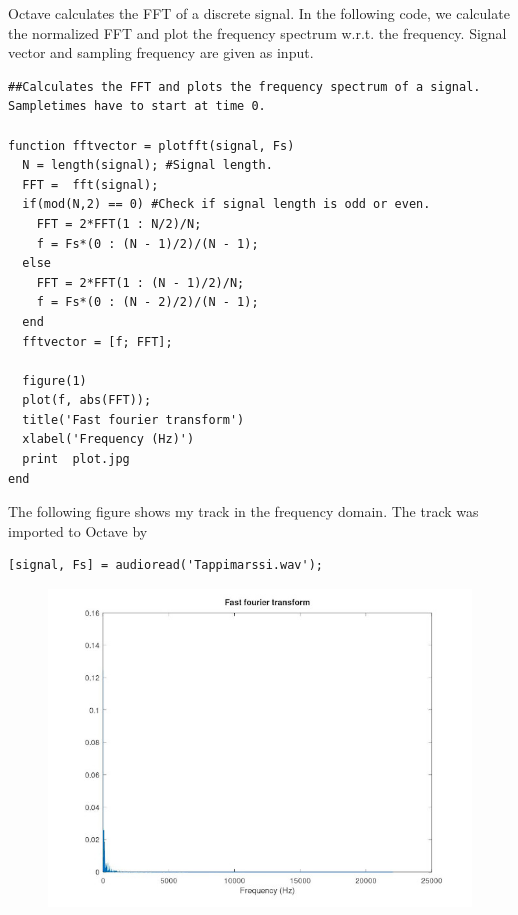 \documentclass{article}
\begin{document}
Octave calculates the FFT of a discrete signal.  In the following code, we calculate the normalized FFT and plot the frequency spectrum w.r.t. the frequency. Signal vector and sampling frequency are given as input.

\begin{verbatim}
##Calculates the FFT and plots the frequency spectrum of a signal. Sampletimes have to start at time 0.

function fftvector = plotfft(signal, Fs)
  N = length(signal); #Signal length.
  FFT =  fft(signal);
  if(mod(N,2) == 0) #Check if signal length is odd or even.
    FFT = 2*FFT(1 : N/2)/N;
    f = Fs*(0 : (N - 1)/2)/(N - 1); 
  else
    FFT = 2*FFT(1 : (N - 1)/2)/N;
    f = Fs*(0 : (N - 2)/2)/(N - 1);
  end  
  fftvector = [f; FFT];
  
  figure(1)
  plot(f, abs(FFT));
  title('Fast fourier transform')
  xlabel('Frequency (Hz)')
  print  plot.jpg
end

\end{verbatim}

The following figure shows my track  in the frequency domain. The track was imported to Octave by

\begin{verbatim}
[signal, Fs] = audioread('Tappimarssi.wav');
\end{verbatim}



\begin{figure}
    \includegraphics[width=\linewidth]{tappimarssi.jpg}
\end{figure}
\end{document}
